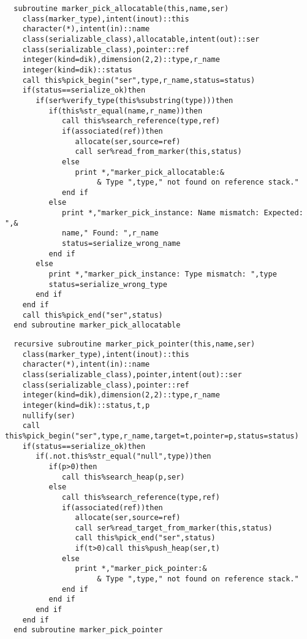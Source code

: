 \begin{Verbatim}
  subroutine marker_pick_allocatable(this,name,ser)
    class(marker_type),intent(inout)::this
    character(*),intent(in)::name
    class(serializable_class),allocatable,intent(out)::ser
    class(serializable_class),pointer::ref
    integer(kind=dik),dimension(2,2)::type,r_name
    integer(kind=dik)::status
    call this%pick_begin("ser",type,r_name,status=status)
    if(status==serialize_ok)then
       if(ser%verify_type(this%substring(type)))then
          if(this%str_equal(name,r_name))then
             call this%search_reference(type,ref)
             if(associated(ref))then
                allocate(ser,source=ref)
                call ser%read_from_marker(this,status)
             else
                print *,"marker_pick_allocatable:&
                     & Type ",type," not found on reference stack."
             end if
          else
             print *,"marker_pick_instance: Name mismatch: Expected: ",&
             name," Found: ",r_name
             status=serialize_wrong_name
          end if
       else
          print *,"marker_pick_instance: Type mismatch: ",type
          status=serialize_wrong_type
       end if
    end if
    call this%pick_end("ser",status)
  end subroutine marker_pick_allocatable
\end{Verbatim}

\begin{Verbatim}
  recursive subroutine marker_pick_pointer(this,name,ser)
    class(marker_type),intent(inout)::this
    character(*),intent(in)::name
    class(serializable_class),pointer,intent(out)::ser
    class(serializable_class),pointer::ref
    integer(kind=dik),dimension(2,2)::type,r_name
    integer(kind=dik)::status,t,p
    nullify(ser)
    call this%pick_begin("ser",type,r_name,target=t,pointer=p,status=status)
    if(status==serialize_ok)then
       if(.not.this%str_equal("null",type))then
          if(p>0)then
             call this%search_heap(p,ser)
          else
             call this%search_reference(type,ref)
             if(associated(ref))then
                allocate(ser,source=ref)
                call ser%read_target_from_marker(this,status)
                call this%pick_end("ser",status)
                if(t>0)call this%push_heap(ser,t)
             else
                print *,"marker_pick_pointer:&
                     & Type ",type," not found on reference stack."
             end if
          end if
       end if
    end if
  end subroutine marker_pick_pointer
\end{Verbatim}

